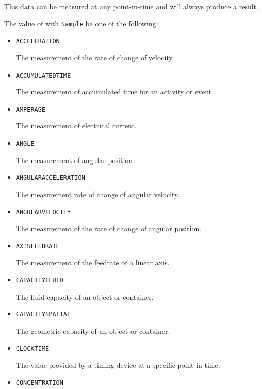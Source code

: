 This data can be measured at any point-in-time and will always produce a result.


The value of  with  \texttt{Sample} \MUST be one of the following:
\begin{itemize}


\item \texttt{ACCELERATION}  

The measurement of the rate of change of velocity.


\item \texttt{ACCUMULATED\textunderscore TIME}  

The measurement of accumulated time for an activity or event.


\item \texttt{AMPERAGE}  

The measurement of electrical current.


\item \texttt{ANGLE}  

The measurement of angular position.


\item \texttt{ANGULAR\textunderscore ACCELERATION}  

The measurement rate of change of angular velocity.


\item \texttt{ANGULAR\textunderscore VELOCITY}  

The measurement of the rate of change of angular position.


\item \texttt{AXIS\textunderscore FEEDRATE}  

The measurement of the feedrate of a linear axis.


\item \texttt{CAPACITY\textunderscore FLUID}  

The fluid capacity of an object or container.


\item \texttt{CAPACITY\textunderscore SPATIAL}  

The geometric capacity of an object or container.


\item \texttt{CLOCK\textunderscore TIME}  

The value provided by a timing device at a specific point in time.


\item \texttt{CONCENTRATION}  


\end{itemize}

